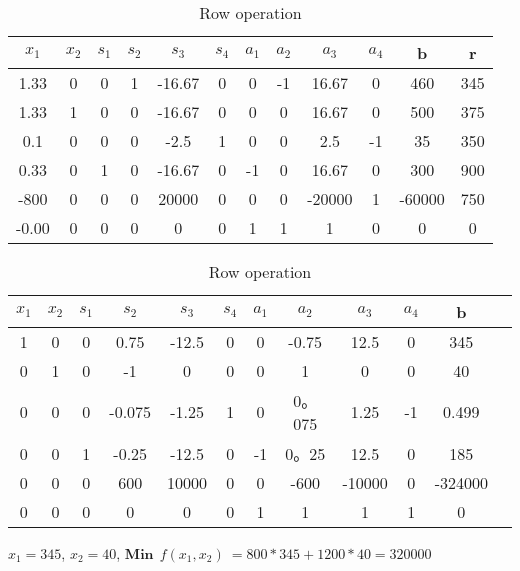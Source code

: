\documentclass{article}
\begin{document}
  \begin{table}[H]
  \centering
  \caption{Row operation}
  \label{my-label}
  \begin{tabular}{|c|c|c|c|c|c|c|c|c|c|c|c|}
  \hline
  $x_1$ & $x_2$ & $s_1$  & $s_2$ & $s_3$ & $s_4$ & $a_1$ & $a_2$ & $a_3$ & $a_4$ & b & r  \\ \hline
  1.33    & 0      & 0       & 1       & -16.67  & 0    & 0        & -1    & 16.67   & 0  & 460  & 345\\ \hline
  1.33    & 1      & 0       & 0       & -16.67  & 0    & 0        & 0     & 16.67   & 0  & 500  & 375\\ \hline
  0.1     & 0      & 0       & 0       & -2.5    & 1    & 0        & 0     & 2.5     & -1 & 35   & 350\\ \hline
  0.33    & 0      & 1       & 0       & -16.67  & 0    & -1       & 0     & 16.67   & 0  & 300  & 900\\ \hline
  -800    & 0      & 0       & 0       & 20000   & 0    & 0        & 0     & -20000  & 1  & -60000 & 750\\ \hline
  -0.00   & 0      & 0       & 0       & 0       & 0    & 1        & 1     & 1       & 0  & 0     & 0 \\ \hline
  \end{tabular}
  \end{table}

  \begin{table}[H]
  \centering
  \caption{Row operation}
  \label{my-label}
  \begin{tabular}{|c|c|c|c|c|c|c|c|c|c|c|c|}
  \hline
  $x_1$ & $x_2$ & $s_1$  & $s_2$ & $s_3$ & $s_4$ & $a_1$ & $a_2$ & $a_3$ & $a_4$ & b \\ \hline
  1   & 0      & 0       & 0.75    & -12.5  & 0    & 0        & -0.75  & 12.5   & 0  & 345  \\ \hline
  0   & 1      & 0       & -1      & 0      & 0    & 0        & 1      & 0      & 0  & 40   \\ \hline
  0   & 0      & 0       & -0.075  & -1.25  & 1    & 0        & 0。075 & 1.25   & -1 & 0.499   \\ \hline
  0   & 0      & 1       & -0.25   & -12.5  & 0    & -1       & 0。25  & 12.5   & 0  & 185  \\ \hline
  0   & 0      & 0       & 600     & 10000  & 0    & 0        & -600   & -10000 & 0  & -324000 \\ \hline
  0   & 0      & 0       & 0       & 0      & 0    & 1        & 1      & 1      & 1  & 0     \\ \hline
  \end{tabular}
  \end{table}


  $x_1=345$, $x_2=40$, $\textbf{Min}\:\: f(x_1,x_2) \: = 800*345 + 1200*40 = 320000$
\end{document}
